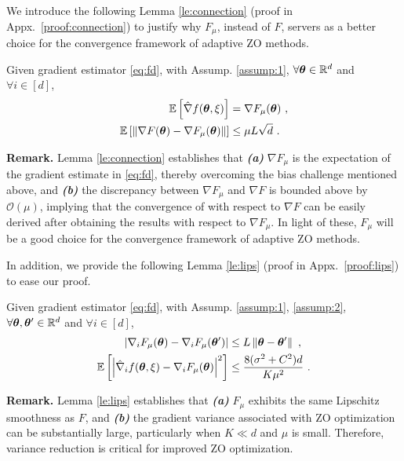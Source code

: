 We introduce the following Lemma \ref{le:connection} (proof in Appx.~\ref{proof:connection}) to justify why $F_{\mu}$, instead of $F$, servers as a better choice for the convergence framework of adaptive ZO methods.
\begin{lemma}\label{le:connection}
Given gradient estimator \eqref{eq:fd}, with Assump. \ref{assump:1}, $\forall {\bm{\theta}} \in \mathbb{R}^d$ and $\forall i \in [d]$,
\begin{align}
\mathbb{E}\left[\hat{\nabla} f({\bm{\theta}}, \xi)\right] &= \nabla F_{\mu}({\bm{\theta}}) \ , \label{eq:skvj} \\
\mathbb{E}\left[\left\|\nabla F({\bm{\theta}}) - \nabla F_{\mu}({\bm{\theta}})\right\|\right] &\leq \mu L\sqrt{d} \ . \label{eq:vine}
\end{align}
\end{lemma}
\textbf{Remark.} Lemma \ref{le:connection} establishes that \textbf{\textit{(a)}} $\nabla F_{\mu}$ is the expectation of the gradient estimate in \eqref{eq:fd}, thereby overcoming the bias challenge mentioned above, and \textbf{\textit{(b)}} the discrepancy between $\nabla F_{\mu}$ and $\nabla F$ is bounded above by $\mathcal{O}(\mu)$, implying that the convergence of \ours{} with respect to $\nabla F$ can be easily derived after obtaining the results with respect to $\nabla F_{\mu}$. In light of these, $F_{\mu}$ will be a good choice for the convergence framework of adaptive ZO methods.

In addition, we provide the following Lemma \ref{le:lips} (proof in Appx.~\ref{proof:lips}) to ease our proof.
\begin{lemma}\label{le:lips}
Given gradient estimator \eqref{eq:fd}, with Assump. \ref{assump:1}, \ref{assump:2}, $\forall {\bm{\theta}},{\bm{\theta}}' \in \mathbb{R}^d$ and $\forall i \in [d]$,
\begin{align}
\left|\nabla_i F_{\mu}({\bm{\theta}}) - \nabla_i F_{\mu}({\bm{\theta}}')\right| &\leq L\left\|{\bm{\theta}} - {\bm{\theta}}'\right\| \ , \label{eq:smoothness-fu} \\
\mathbb{E}\left[\left|\hat{\nabla}_i f({\bm{\theta}}, \xi) - \nabla_i F_{\mu}({\bm{\theta}})\right|^2\right] &\leq \frac{8(\sigma^2 + C^2)d}{K\mu^2} \ . \label{eq:var-fu}
\end{align}
\end{lemma}
\textbf{Remark.} Lemma \ref{le:lips} establishes that \textbf{\textit{(a)}} $F_{\mu}$ exhibits the same Lipschitz smoothness as $F$, and \textbf{\textit{(b)}} the gradient variance associated with ZO optimization can be substantially large, particularly when $K \ll d$ and $\mu$ is small. Therefore, variance reduction is critical for improved ZO optimization.

